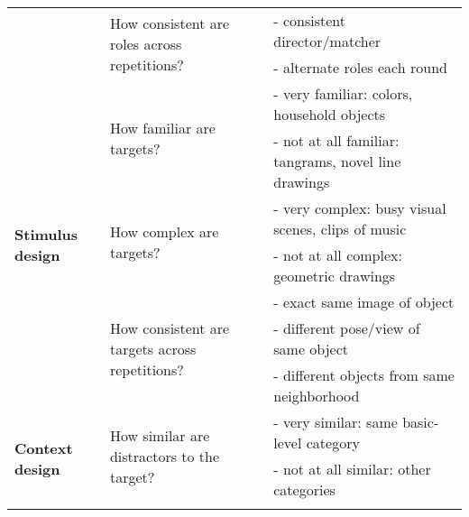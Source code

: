 \begin{table}[th!]
{\begin{tabular}{@{}lll@{}}
                                            & \multirow{2}{*}{How consistent are roles across repetitions?}   & - consistent director/matcher                                              \\
                                            &                                                                 & - alternate roles each round                                               \\ \midrule
\multirow{7}{*}{\textbf{Stimulus design}}   & \multirow{2}{*}{How familiar are targets?}                      & - very familiar: colors, household objects                                 \\
                                            &                                                                 & - not at all familiar: tangrams, novel line drawings                       \\ \cmidrule(l){2-3} 
                                            & \multirow{2}{*}{How complex are targets?}                       & - very complex: busy visual scenes, clips of music                         \\
                                            &                                                                 & - not at all complex: geometric drawings                                   \\ \cmidrule(l){2-3} 
                                            & \multirow{3}{*}{How consistent are targets across repetitions?} & - exact same image of object                                               \\
                                            &                                                                 & - different pose/view of same object                                       \\
                                            &                                                                 & - different objects from same neighborhood                                 \\ \midrule
\multirow{5}{*}{\textbf{Context design}}    & \multirow{2}{*}{How similar are distractors to the target?}     & - very similar: same basic-level category                                  \\
                                            &                                                                 & - not at all similar: other categories                                     \\ \cmidrule(l){2-3} 

\end{tabular}}
\end{table}
